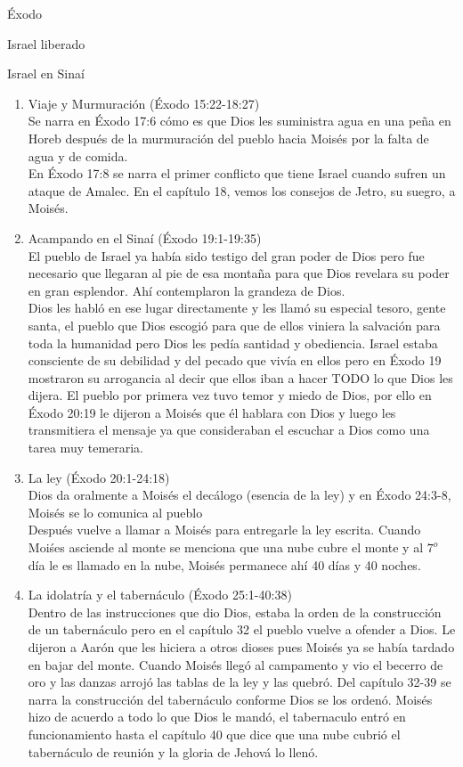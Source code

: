 \begin{section}{Éxodo}
\begin{subsection}{Israel liberado}
	\end{subsection}
	\begin{subsection}{Israel en Sinaí}
		\begin{enumerate}
			\item Viaje y Murmuración (Éxodo 15:22-18:27)\\
Se narra en Éxodo 17:6 cómo es que Dios les suministra agua en una peña en Horeb después de la murmuración del pueblo hacia Moisés por la falta de agua y de comida.\\
En Éxodo 17:8 se narra el primer conflicto que tiene Israel cuando sufren un ataque de Amalec. En el capítulo 18, vemos los consejos de Jetro, su suegro,  a Moisés.
\item Acampando en el Sinaí (Éxodo 19:1-19:35)\\
	El pueblo de Israel ya había sido testigo del gran poder de Dios pero fue necesario que llegaran al pie de esa montaña para que Dios revelara su poder en gran esplendor. Ahí contemplaron la grandeza de Dios.\\
	Dios les habló en ese lugar directamente y les llamó su especial tesoro, gente santa, el pueblo que Dios escogió para que de ellos viniera la salvación para toda la humanidad pero Dios les pedía santidad y obediencia. Israel estaba consciente de su debilidad y del pecado que vivía en ellos pero en Éxodo 19 mostraron su arrogancia al decir que ellos iban a hacer TODO lo que Dios les dijera. El pueblo por primera vez tuvo temor y miedo de Dios, por ello en Éxodo 20:19 le dijeron a Moisés que él hablara con Dios y luego les transmitiera el mensaje ya que consideraban el escuchar a Dios como una tarea muy temeraria.
	\item La ley (Éxodo 20:1-24:18)\\
	Dios da oralmente a Moisés el decálogo (esencia de la ley) y en Éxodo 24:3-8, Moisés se lo comunica al pueblo\\
	Después vuelve a llamar a Moisés para entregarle la ley escrita. Cuando Moiśes asciende al monte se menciona que una nube cubre el monte y al $7^o$ día le es llamado en la nube, Moisés permanece ahí 40 días y 40 noches.
\item La idolatría y el tabernáculo (Éxodo 25:1-40:38)\\
	Dentro de las instrucciones que dio Dios, estaba la orden de la construcción de un tabernáculo pero en el capítulo 32 el pueblo vuelve a ofender a Dios. Le dijeron a Aarón que les hiciera a otros dioses pues Moisés ya se había tardado en bajar del monte. Cuando Moisés llegó al campamento y vio el becerro de oro y las danzas arrojó las tablas de la ley y las quebró. Del capítulo 32-39 se narra la construcción del tabernáculo conforme Dios se los ordenó. Moisés hizo de acuerdo a todo lo que Dios le mandó, el tabernaculo entró en funcionamiento hasta el capítulo 40 que dice que una nube cubrió el tabernáculo de reunión y la gloria de Jehová lo llenó.
		\end{enumerate}
	\end{subsection}
\end{section}


%


